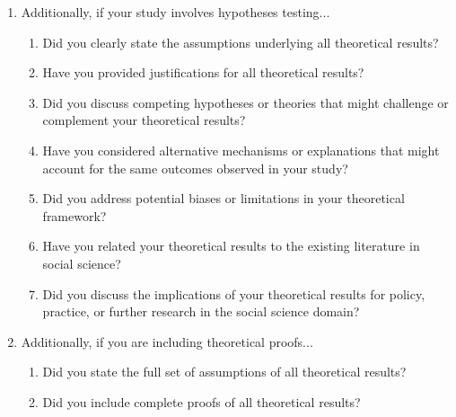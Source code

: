 \begin{enumerate}
\begin{enumerate}
  \item Did you describe steps taken to prevent or mitigate potential negative outcomes of the research, such as data and model documentation, data anonymization, responsible release, access control, and the reproducibility of findings?
  \item Have you read the ethics review guidelines and ensured that your paper conforms to them?
\end{enumerate}

\item Additionally, if your study involves hypotheses testing...
\begin{enumerate}
  \item Did you clearly state the assumptions underlying all theoretical results?
  \item Have you provided justifications for all theoretical results?
  \item Did you discuss competing hypotheses or theories that might challenge or complement your theoretical results?
  \item Have you considered alternative mechanisms or explanations that might account for the same outcomes observed in your study?
  \item Did you address potential biases or limitations in your theoretical framework?
  \item Have you related your theoretical results to the existing literature in social science?
  \item Did you discuss the implications of your theoretical results for policy, practice, or further research in the social science domain?
\end{enumerate}

\item Additionally, if you are including theoretical proofs...
\begin{enumerate}
  \item Did you state the full set of assumptions of all theoretical results?
  \item Did you include complete proofs of all theoretical results?
\end{enumerate}


\end{enumerate}

